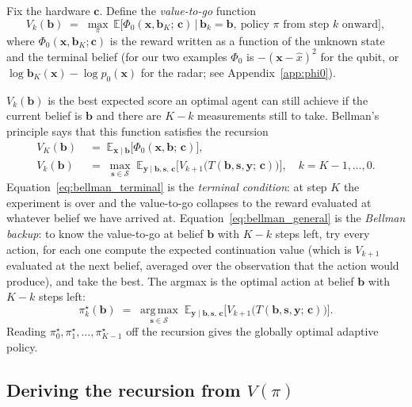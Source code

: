 \documentclass[11pt]{article}
\newcommand{\bc}{\bm{c}}
\newcommand{\bx}{\bm{x}}
\newcommand{\by}{\bm{y}}
\newcommand{\bs}{\bm{s}}
\newcommand{\bb}{\bm{b}}
\newcommand{\E}{\mathbb{E}}
\newcommand{\argmax}{\operatorname*{arg\,max}}
\begin{document}
Fix the hardware $\bc$.  Define the \emph{value-to-go} function
\begin{equation}
V_k(\bb) \;=\; \max_{\pi}\, \E\bigl[\Phi_0(\bx, \bb_K;\, \bc) \,\big|\, \bb_k = \bb,\ \text{policy $\pi$ from step $k$ onward}\bigr],
\label{eq:V_k_def}
\end{equation}
where $\Phi_0(\bx, \bb_K; \bc)$ is the reward written as a function of the unknown state and the terminal belief (for our two examples $\Phi_0$ is $-(\bx - \hat{x})^2$ for the qubit, or $\log \bb_K(\bx) - \log p_0(\bx)$ for the radar; see Appendix~\ref{app:phi0}).

$V_k(\bb)$ is the best expected score an optimal agent can still achieve if the current belief is $\bb$ and there are $K - k$ measurements still to take.  Bellman's principle says that this function satisfies the recursion
\begin{align}
V_K(\bb) &\;=\; \E_{\bx \mid \bb}\!\bigl[\Phi_0(\bx, \bb;\, \bc)\bigr], \label{eq:bellman_terminal}\\
V_k(\bb) &\;=\; \max_{\bs \in \mathcal{S}}\; \E_{\by \mid \bb, \bs,\, \bc}\!\bigl[V_{k+1}\bigl(T(\bb, \bs, \by;\, \bc)\bigr)\bigr], \quad k = K-1, \ldots, 0.
\label{eq:bellman_general}
\end{align}
Equation~\eqref{eq:bellman_terminal} is the \emph{terminal condition}: at step $K$ the experiment is over and the value-to-go collapses to the reward evaluated at whatever belief we have arrived at.  Equation~\eqref{eq:bellman_general} is the \emph{Bellman backup}: to know the value-to-go at belief $\bb$ with $K - k$ steps left, try every action, for each one compute the expected continuation value (which is $V_{k+1}$ evaluated at the next belief, averaged over the observation that the action would produce), and take the best.  The argmax is the optimal action at belief $\bb$ with $K - k$ steps left:
\begin{equation}
\pi^\star_k(\bb) \;=\; \argmax_{\bs \in \mathcal{S}}\; \E_{\by \mid \bb, \bs,\, \bc}\!\bigl[V_{k+1}\bigl(T(\bb, \bs, \by;\, \bc)\bigr)\bigr].
\label{eq:pi_star}
\end{equation}
Reading $\pi^\star_0, \pi^\star_1, \ldots, \pi^\star_{K-1}$ off the recursion gives the globally optimal adaptive policy.

\subsection{Deriving the recursion from \texorpdfstring{$V(\pi)$}{V(pi)}}
\label{sec:derivation}
\end{document}
